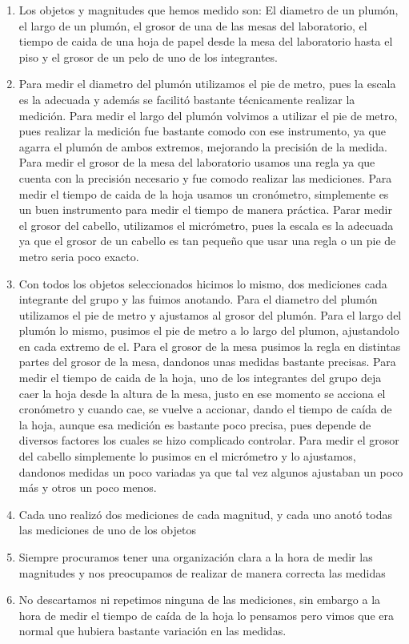 \documentclass[12pt,a4paper]{article}
\begin{document}
\begin{enumerate}[label=\alph*)]
\item Los objetos y magnitudes que hemos medido son: El diametro de un plumón, el largo de un plumón, el grosor de una de las mesas del laboratorio, el tiempo de caida de una hoja de papel desde la mesa del laboratorio hasta el piso y el grosor de un pelo de uno de los integrantes.
\item Para medir el diametro del plumón utilizamos el pie de metro, pues la escala es la adecuada y además se facilitó bastante técnicamente realizar la medición. Para medir el largo del plumón volvimos a utilizar el pie de metro, pues realizar la medición fue bastante comodo con ese instrumento, ya que agarra el plumón de ambos extremos, mejorando la precisión de la medida.
   Para medir el grosor de la mesa del laboratorio usamos una regla ya que cuenta con la precisión necesario y fue comodo realizar las mediciones. Para medir el tiempo de caida de la hoja usamos un cronómetro, simplemente es un buen instrumento para medir el tiempo de manera práctica. Parar medir el grosor del cabello, utilizamos el micrómetro, pues la escala es la adecuada 
   ya que el grosor de un cabello es tan pequeño que usar una regla o un pie de metro seria poco exacto. 
\item Con todos los objetos seleccionados hicimos lo mismo, dos mediciones cada integrante del grupo y las fuimos anotando. Para el diametro del plumón utilizamos el pie de metro y ajustamos al grosor del plumón. Para el largo del plumón lo mismo, pusimos el pie de metro a lo largo del plumon, ajustandolo en cada extremo de el.
   Para el grosor de la mesa pusimos la regla en distintas partes del grosor de la mesa, dandonos unas medidas bastante precisas. Para medir el tiempo de caida de la hoja, uno de los integrantes del grupo deja caer la hoja desde la altura de la mesa, justo en ese momento se acciona el cronómetro y cuando cae, se vuelve a accionar, dando el tiempo de caída de la hoja,
   aunque esa medición es bastante poco precisa, pues depende de diversos factores los cuales se hizo complicado controlar. Para medir el grosor del cabello simplemente lo pusimos en el micrómetro y lo ajustamos, dandonos medidas un poco variadas ya que tal vez algunos ajustaban un poco más y otros un poco menos.
\item Cada uno realizó dos mediciones de cada magnitud, y cada uno anotó todas las mediciones de uno de los objetos
\item Siempre procuramos tener una organización clara a la hora de medir las magnitudes y nos preocupamos de realizar de manera correcta las medidas
\item No descartamos ni repetimos ninguna de las mediciones, sin embargo a la hora de medir el tiempo de caída de la hoja lo pensamos pero vimos que era normal que hubiera bastante variación en las medidas.
\end{enumerate}
\end{document}
